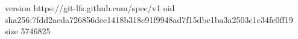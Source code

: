 version https://git-lfs.github.com/spec/v1
oid sha256:7fdd2aeda726856dee1418b318e91f9948ad7f15dbe1ba3a2503c1c34fe0ff19
size 5746825
